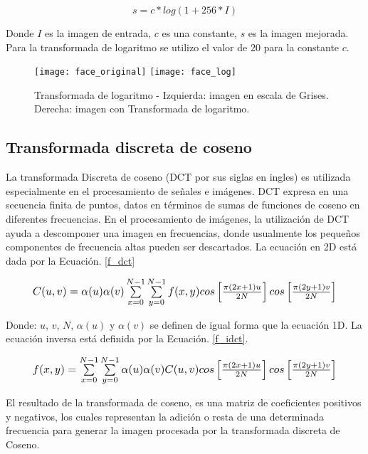 \begin{equation}
\label{f_log}
s = c*log(1+ 256*I)
\end{equation}

Donde $I$ es la imagen de entrada, $c$ es una constante, $s$ es la imagen mejorada. Para la transformada de logaritmo se utilizo el valor de 20 para la constante $ c $. 

\begin{figure}[h]
\center
\texttt{[image: face\_original]}
\hspace{1cm}
\texttt{[image: face\_log]}
\caption{Transformada de logaritmo - Izquierda: imagen en escala de Grises. Derecha: imagen con Transformada de logaritmo.}
\label{im:log}
\end{figure}

\subsection{Transformada discreta de coseno}
La transformada Discreta de coseno (DCT por sus siglas en ingles) es utilizada especialmente en el procesamiento de señales e imágenes. DCT expresa en una secuencia finita de puntos, datos en términos de sumas de funciones de coseno en diferentes frecuencias. En el procesamiento de imágenes, la utilización de DCT ayuda a descomponer una imagen en frecuencias, donde usualmente los pequeños componentes de frecuencia altas pueden ser descartados. La ecuación en 2D está dada por la Ecuación. \ref{f_dct}
\cite{thamiz2015liter}\cite{vish2015ill}

\begin{equation}
	\label{f_dct}
	\resizebox{0.91\hsize}{!}{
		$ C(u,v) = \alpha(u)\alpha(v)\sum\limits_{x=0}^{N-1} \sum\limits_{y=0}^{N-1}f(x,y)cos\left[\frac{\pi(2x + 1)u}{2N}\right]cos\left[\frac{\pi(2y + 1)v}{2N}\right] $
	}
\end{equation}

Donde: $u$, $v$, $N$, $\alpha(u)$ y $\alpha(v)$ se definen de igual forma que la ecuación 1D. La ecuación inversa está definida por la Ecuación. \ref{f_idct}.

\begin{equation}
	\label{f_idct}
	\resizebox{0.91\hsize}{!}{
		$ f(x,y) = \sum\limits_{x=0}^{N-1}\sum\limits_{y=0}^{N-1} \alpha(u)\alpha(v)C(u,v)cos\left[\frac{\pi(2x + 1)u}{2N}\right]cos\left[\frac{\pi(2y + 1)v}{2N}\right]$
	}
\end{equation}

El resultado de la transformada de coseno, es una matriz de coeficientes positivos y negativos, los cuales representan la adición o resta de una determinada frecuencia para generar la imagen procesada por la transformada discreta de Coseno.

